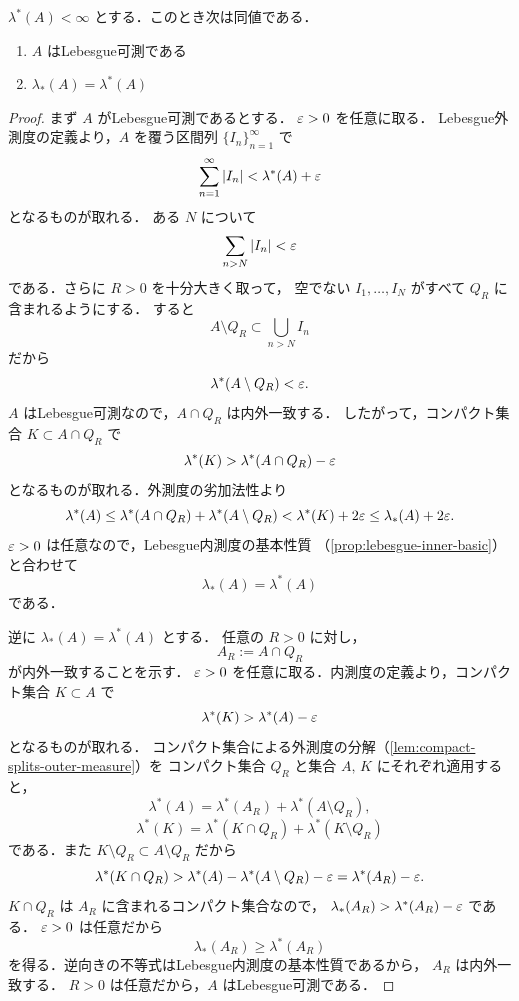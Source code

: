 \begin{theorem}[有限外測度集合の可測性]\label{thm:finite-outer-measurable-iff-inner-outer}
$\lambda^*(A)<\infty$ とする．このとき次は同値である．
\begin{enumerate}
    \item $A$ はLebesgue可測である
    \item $\lambda_*(A)=\lambda^*(A)$
\end{enumerate}
\end{theorem}
\begin{proof}
まず $A$ がLebesgue可測であるとする．
$\varepsilon>0$ を任意に取る．
Lebesgue外測度の定義より，$A$ を覆う区間列 $\{I_n\}_{n=1}^{\infty}$ で
\[
\sum_{n=1}^{\infty}|I_n|<\lambda^*(A)+\varepsilon
\]
となるものが取れる．
ある $N$ について
\[
\sum_{n>N}|I_n|<\varepsilon
\]
である．さらに $R>0$ を十分大きく取って，
空でない $I_1,\dots,I_N$ がすべて $Q_R$ に含まれるようにする．
すると
\[
A\setminus Q_R\subset\bigcup_{n>N} I_n
\]
だから
\[
\lambda^*(A\setminus Q_R)<\varepsilon.
\]
$A$ はLebesgue可測なので，$A\cap Q_R$ は内外一致する．
したがって，コンパクト集合 $K\subset A\cap Q_R$ で
\[
\lambda^*(K)>\lambda^*(A\cap Q_R)-\varepsilon
\]
となるものが取れる．外測度の劣加法性より
\[
\lambda^*(A)
\le
\lambda^*(A\cap Q_R)+\lambda^*(A\setminus Q_R)
<
\lambda^*(K)+2\varepsilon
\le
\lambda_*(A)+2\varepsilon.
\]
$\varepsilon>0$ は任意なので，Lebesgue内測度の基本性質
（\cref{prop:lebesgue-inner-basic}）と合わせて
\[
\lambda_*(A)=\lambda^*(A)
\]
である．

逆に $\lambda_*(A)=\lambda^*(A)$ とする．
任意の $R>0$ に対し，
\[
A_R:=A\cap Q_R
\]
が内外一致することを示す．
$\varepsilon>0$ を任意に取る．内測度の定義より，コンパクト集合 $K\subset A$ で
\[
\lambda^*(K)>\lambda^*(A)-\varepsilon
\]
となるものが取れる．
コンパクト集合による外測度の分解（\cref{lem:compact-splits-outer-measure}）を
コンパクト集合 $Q_R$ と集合 $A,\,K$ にそれぞれ適用すると，
\[
\lambda^*(A)=\lambda^*(A_R)+\lambda^*(A\setminus Q_R),
\]
\[
\lambda^*(K)
=
\lambda^*(K\cap Q_R)+\lambda^*(K\setminus Q_R)
\]
である．また $K\setminus Q_R\subset A\setminus Q_R$ だから
\[
\lambda^*(K\cap Q_R)
>
\lambda^*(A)-\lambda^*(A\setminus Q_R)-\varepsilon
=
\lambda^*(A_R)-\varepsilon.
\]
$K\cap Q_R$ は $A_R$ に含まれるコンパクト集合なので，
$\lambda_*(A_R)>\lambda^*(A_R)-\varepsilon$ である．
$\varepsilon>0$ は任意だから
\[
\lambda_*(A_R)\ge \lambda^*(A_R)
\]
を得る．逆向きの不等式はLebesgue内測度の基本性質であるから，
$A_R$ は内外一致する．
$R>0$ は任意だから，$A$ はLebesgue可測である．
\end{proof}

